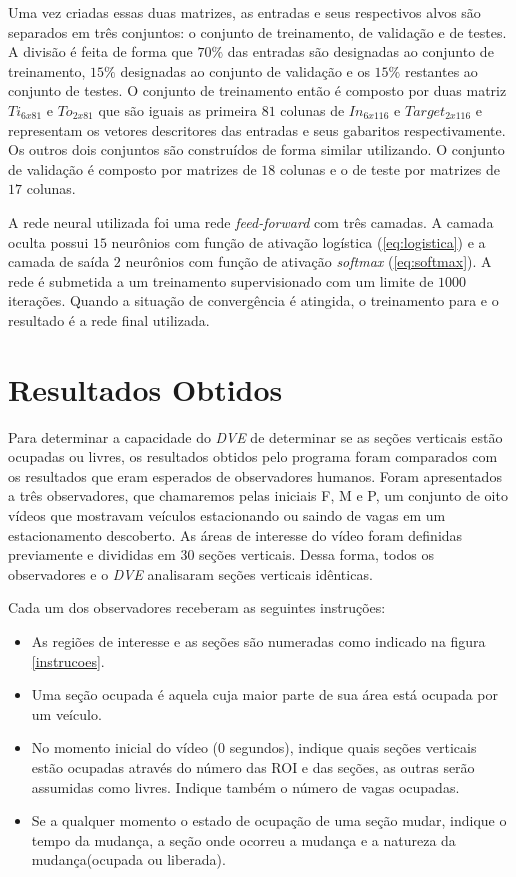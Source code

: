 Uma vez criadas essas duas matrizes, as entradas e seus respectivos alvos são separados em três conjuntos: o conjunto de treinamento, de validação e de testes. A divisão é feita de forma que $70\%$ das entradas são designadas ao conjunto de treinamento, $15\%$ designadas ao conjunto de validação e os $15\%$ restantes ao conjunto de testes. O conjunto de treinamento então é composto por duas matriz $Ti_{6x81}$ e $To_{2x81}$ que são iguais as primeira $81$ colunas de $In_{6x116}$ e $Target_{2x116}$ e representam os vetores descritores das entradas e seus gabaritos respectivamente. Os outros dois conjuntos são construídos de forma similar utilizando. O conjunto de validação é composto por matrizes de $18$ colunas e o de teste por matrizes de $17$ colunas.


A rede neural utilizada foi uma rede \textit{feed-forward} com três camadas. A camada oculta possui $15$ neurônios com função de ativação logística (\ref{eq:logistica}) e a camada de saída $2$ neurônios com função de ativação \textit{softmax} (\ref{eq:softmax}). A rede é submetida a um treinamento supervisionado com um limite de $1000$ iterações. Quando a situação de convergência é atingida, o treinamento para e o resultado é a rede final utilizada.


\section{Resultados Obtidos}

Para determinar a capacidade do \textit{DVE} de determinar se as seções verticais estão ocupadas ou livres, os resultados obtidos pelo programa foram comparados com os resultados que eram esperados de observadores humanos. Foram apresentados a três observadores, que chamaremos pelas iniciais F, M e P, um conjunto de oito vídeos que mostravam veículos estacionando ou saindo de vagas em um estacionamento descoberto. As áreas de interesse do vídeo foram definidas previamente e divididas em $30$ seções verticais. Dessa forma, todos os observadores e o \textit{DVE} analisaram seções verticais idênticas. 

Cada um dos observadores receberam as seguintes instruções:

\begin{itemize}
  \item As regiões de interesse e as seções são numeradas como indicado na figura \ref{instrucoes}.
	\item Uma seção ocupada é aquela cuja maior parte de sua área está ocupada por um veículo.
	\item No momento inicial do vídeo ($0$ segundos), indique quais seções verticais estão ocupadas através do número das ROI e das seções, as outras serão assumidas como livres. Indique também o número de vagas ocupadas.
	\item Se a qualquer momento o estado de ocupação de uma seção mudar, indique o tempo da mudança, a seção onde ocorreu a mudança e a natureza da mudança(ocupada ou liberada).
\end{itemize}

